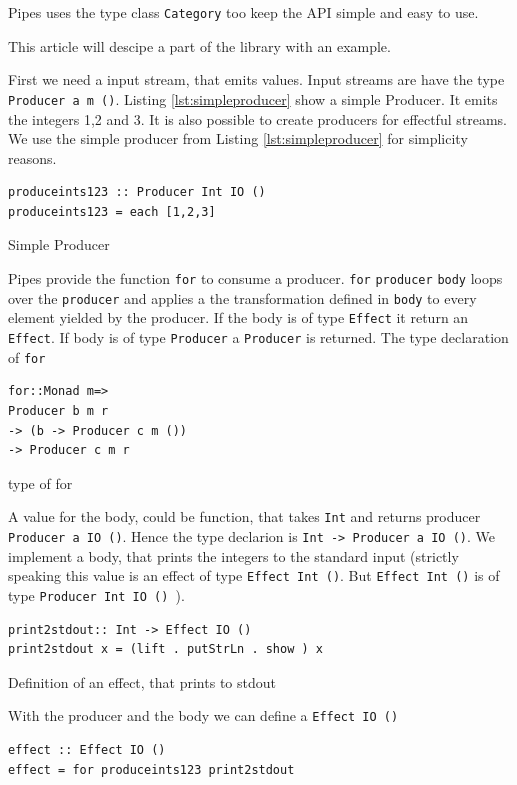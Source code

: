 \documentclass[twoside, a4paper, 12pt]{article}
\begin{document}
Pipes uses the type class \verb|Category| too keep the API simple and easy to use.

This article will descipe a part of the library with an example.

First we need a input stream, that emits values. Input streams are have the type 
\verb|Producer a m ()|.
Listing \ref{lst:simpleproducer} show a simple Producer. It emits the integers 1,2 and 3. It is also possible to create producers for effectful streams. We use the simple producer from Listing \ref{lst:simpleproducer} for simplicity reasons.

\begin{program}
\begin{verbatim}
produceints123 :: Producer Int IO ()
produceints123 = each [1,2,3]
\end{verbatim}
\caption{Simple Producer}
\label{lst:simpleproducer}
\end{program}

Pipes provide the function \verb|for| to consume a producer. 
\verb|for| \verb|producer| \verb|body| loops over the \verb|producer| and applies a the transformation defined in \verb|body| to every element yielded by the producer. If the body is of type \verb|Effect| it return an \verb|Effect|. If body is of type \verb|Producer| a \verb|Producer| is returned. The type declaration of \verb|for| 
\begin{program}
\begin{verbatim}
for::Monad m=>
Producer b m r
-> (b -> Producer c m ())
-> Producer c m r
\end{verbatim}
\caption{type of for}
\end{program}

A value for the body, could be function, that takes \verb|Int| and returns producer \verb|Producer a IO ()|. Hence the type declarion is \verb|Int -> Producer a IO ()|. We implement a body, that prints the integers to the standard input (strictly speaking this value is an effect of type \verb|Effect Int ()|. But \verb|Effect Int ()| is of type \verb|Producer Int IO () |).

\begin{program}
\begin{verbatim}
print2stdout:: Int -> Effect IO ()
print2stdout x = (lift . putStrLn . show ) x
\end{verbatim}
\caption{Definition of an effect, that prints to stdout}
\label{lst:stdouteffect}
\end{program}

With the producer and the body we can define a \verb|Effect IO ()|
\begin{verbatim}
effect :: Effect IO ()
effect = for produceints123 print2stdout
\end{verbatim}
\end{document}
